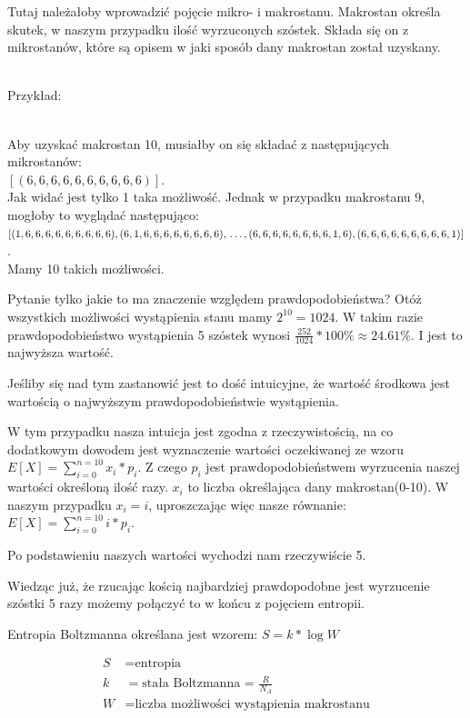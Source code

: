 \documentclass[11pt, a4paper, fleqn]{article}
\begin{document}
    Tutaj należałoby wprowadzić pojęcie mikro- i makrostanu. Makrostan określa skutek, w naszym przypadku ilość wyrzuconych szóstek.
    Składa się on z mikrostanów, które są opisem w jaki sposób dany makrostan został uzyskany. \\ \\
    \noindent \begin{large}Przykład:\end{large}  \\

    Aby uzyskać makrostan 10, musiałby on się składać z następujących mikrostanów: \\
    $[(6,6,6,6,6,6,6,6,6,6)]$.\\
    Jak widać jest tylko 1 taka możliwość. Jednak w przypadku makrostanu 9, mogłoby to wyglądać następująco:\\
    $[(1,6,6,6,6,6,6,6,6,6), (6,1,6,6,6,6,6,6,6,6),\\ \dots,\\(6,6,6,6,6,6,6,6,1,6), (6,6,6,6,6,6,6,6,6,1)]$. \\
    Mamy 10 takich możliwości.

    Pytanie tylko jakie to ma znaczenie względem prawdopodobieństwa?
    Otóż wszystkich możliwości wystąpienia stanu mamy $2^{10}=1024$. W takim razie prawdopodobieństwo
    wystąpienia 5 szóstek wynosi $\frac{252}{1024}*100 \% \approx 24.61\%$. I jest to najwyższa wartość.

    Jeśliby się nad tym zastanowić jest to dość intuicyjne, że wartość środkowa jest wartością o najwyższym prawdopodobieństwie
    wystąpienia.

    W tym przypadku nasza intuicja jest zgodna z rzeczywistością, na co dodatkowym dowodem jest wyznaczenie
    wartości oczekiwanej ze wzoru $E[X] = \sum_{i=0}^{n=10} x_i * p_i$. Z czego $p_i$ jest prawdopodobieństwem wyrzucenia
    naszej wartości określoną ilość razy. $x_i$ to liczba określająca dany makrostan(0-10). W naszym przypadku $x_i = i$, 
    uproszczając więc nasze równanie: $E[X] = \sum_{i=0}^{n=10} i*p_i$. 

    Po podstawieniu naszych wartości wychodzi nam rzeczywiście 5.

    Wiedząc już, że rzucając kością najbardziej prawdopodobne jest wyrzucenie szóstki 5 razy możemy połączyć to w końcu
    z pojęciem entropii.

    Entropia Boltzmanna określana jest wzorem: $S = k*\log{W}$

    \begin{align*}
        S &= \text{entropia}\\
        k &= \text{stała Boltzmanna = $\frac{R}{N_A}$}\\
        W &= \text{liczba możliwości wystąpienia makrostanu}
    \end{align*}
\end{document}
